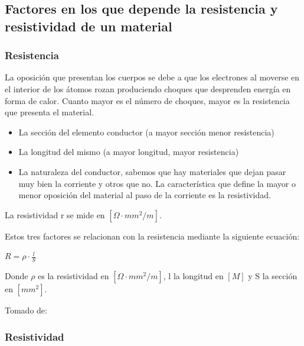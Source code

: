 \documentclass[letterpaper, 12pt]{report}
\begin{document}


\subsection{Factores en los que depende la resistencia y resistividad de un
	material}

\subsubsection*{Resistencia}

La oposición que presentan los cuerpos se debe a que los electrones al moverse
en el interior de los átomos rozan produciendo choques que desprenden energía
en forma de calor. Cuanto mayor es el número de choques, mayor es la
resistencia que presenta el material.

\begin{itemize}
	\item La sección del elemento conductor (a mayor sección menor resistencia)
	\item La longitud del mismo (a mayor longitud, mayor resistencia)
	\item La naturaleza del conductor, sabemos que hay materiales que dejan
	      pasar muy bien la corriente y otros que no. La característica que
	      define la mayor o menor oposición del material al paso de la corriente
	      es la resistividad.
\end{itemize}

La resistividad r se mide en $[\Omega \cdot mm^2 /m]$.

Estos tres factores se relacionan con la resistencia mediante la siguiente
ecuación:

\smallskip

$R = \rho \cdot \frac{l}{S}$

\smallskip

Donde $\rho$ es la resistividad en $[\Omega \cdot mm^2 /m]$, l la longitud
en $[M]$ y S la sección en $[mm^2]$.

Tomado de:~\cite{ResistenciaElectrica}

\subsubsection{Resistividad}
\end{document}
